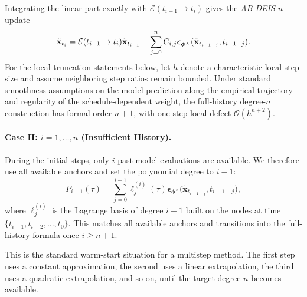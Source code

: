 Integrating the linear part exactly with
$\mathcal{E}(t_{i-1}\to t_i)$ gives the \emph{AB-DEIS-$n$} update
\[
\tilde{{\mathbf{x}}}_{t_i}
=
\mathcal{E}(t_{i-1}\to t_i)\tilde{{\mathbf{x}}}_{t_{i-1}}
+
\sum_{j=0}^{n}
C_{i,j}
{\bm{\epsilon}}_{\bm{\phi}^\times}
(\tilde{{\mathbf{x}}}_{t_{i-1-j}},t_{i-1-j}).
\]
For the local truncation statements below, let $h$ denote a characteristic
local step size and assume neighboring step ratios remain bounded. Under
standard smoothness assumptions on the model prediction along the empirical
trajectory and regularity of the schedule-dependent weight, the full-history
degree-$n$ construction has formal order $n+1$, with one-step local defect
$\mathcal O(h^{n+2})$.


\paragraph{Case II: $i=1,\dots,n$ (Insufficient History).}
During the initial steps, only $i$ past model evaluations are available.
We therefore use all available anchors and set the polynomial degree to
$i{-}1$:
\[
P_{i-1}(\tau)
=
\sum_{j=0}^{i-1}
\ell_j^{(i)}(\tau) 
\bm{\epsilon}_{\bm{\phi}^\times}\bigl(\tilde{\mathbf x}_{t_{i-1-j}},  t_{i-1-j}\bigr),
\]
where $\ell_j^{(i)}$ is the Lagrange basis of degree $i{-}1$ built on the nodes at time
$\{t_{i-1}, t_{i-2},\ldots,t_{0}\}$. This matches all available anchors and
transitions into the full-history formula once $i\ge n{+}1$.

This is the standard warm-start situation for a multistep method. The first
step uses a constant approximation, the second uses a linear extrapolation,
the third uses a quadratic extrapolation, and so on, until the target degree
$n$ becomes available.



